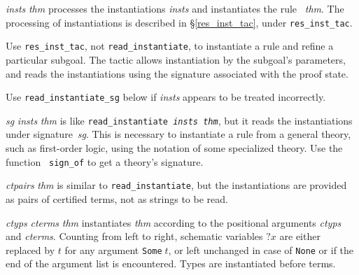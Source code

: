 \begin{ttdescription}
\item[\ttindexbold{read_instantiate} {\it insts} {\it thm}] 
processes the instantiations {\it insts} and instantiates the rule~{\it
thm}.  The processing of instantiations is described
in \S\ref{res_inst_tac}, under {\tt res_inst_tac}.  

Use {\tt res_inst_tac}, not {\tt read_instantiate}, to instantiate a rule
and refine a particular subgoal.  The tactic allows instantiation by the
subgoal's parameters, and reads the instantiations using the signature
associated with the proof state.

Use {\tt read_instantiate_sg} below if {\it insts\/} appears to be treated
incorrectly.

\item[\ttindexbold{read_instantiate_sg} {\it sg} {\it insts} {\it thm}]
  is like \texttt{read_instantiate {\it insts}~{\it thm}}, but it reads
  the instantiations under signature~{\it sg}.  This is necessary to
  instantiate a rule from a general theory, such as first-order logic,
  using the notation of some specialized theory.  Use the function {\tt
    sign_of} to get a theory's signature.

\item[\ttindexbold{cterm_instantiate} {\it ctpairs} {\it thm}] 
is similar to {\tt read_instantiate}, but the instantiations are provided
as pairs of certified terms, not as strings to be read.

\item[\ttindexbold{instantiate'} {\it ctyps} {\it cterms} {\it thm}]
  instantiates {\it thm} according to the positional arguments {\it
    ctyps} and {\it cterms}.  Counting from left to right, schematic
  variables $?x$ are either replaced by $t$ for any argument
  \texttt{Some\(\;t\)}, or left unchanged in case of \texttt{None} or
  if the end of the argument list is encountered.  Types are
  instantiated before terms.

\end{ttdescription}


